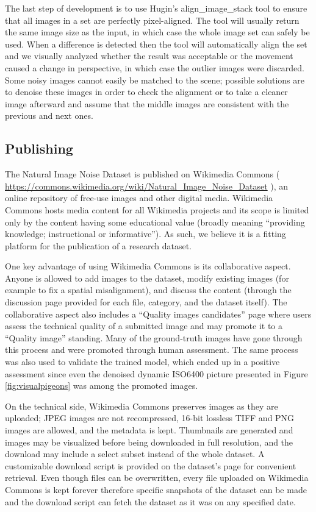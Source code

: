 The last step of development is to use Hugin's align\_image\_stack tool \cite{hugin} to ensure that all images in a set are perfectly pixel-aligned. The tool will usually return the same image size as the input, in which case the whole image set can safely be used. When a difference is detected then the tool will automatically align the set and we visually analyzed whether the result was acceptable or the movement caused a change in perspective, in which case the outlier images were discarded. Some noisy images cannot easily be matched to the scene; possible solutions are to denoise these images in order to check the alignment or to take a cleaner image afterward and assume that the middle images are consistent with the previous and next ones.
\subsection{Publishing}
The Natural Image Noise Dataset is published on Wikimedia Commons ( \url{https://commons.wikimedia.org/wiki/Natural_Image_Noise_Dataset} ), an online repository of free-use images and other digital media. Wikimedia Commons hosts media content for all Wikimedia projects and its scope is limited only by the content having some educational value (broadly meaning ``providing knowledge; instructional or informative''). As such, we believe it is a fitting platform for the publication of a research dataset.

One key advantage of using Wikimedia Commons is its collaborative aspect. Anyone is allowed to add images to the dataset, modify existing images (for example to fix a spatial misalignment), and discuss the content (through the discussion page provided for each file, category, and the dataset itself). The collaborative aspect also includes a ``Quality images candidates'' page \cite{qic} where users assess the technical quality of a submitted image and may promote it to a ``Quality image'' standing. Many of the ground-truth images have gone through this process and were promoted through human assessment. The same process was also used to validate the trained model, which ended up in a positive assessment since even the denoised dynamic ISO6400 picture presented in Figure \ref{fig:visualpigeons} was among the promoted images.

On the technical side, Wikimedia Commons preserves images as they are uploaded; JPEG images are not recompressed, 16-bit lossless TIFF and PNG images are allowed, and the metadata is kept. Thumbnails are generated and images may be visualized before being downloaded in full resolution, and the download may include a select subset instead of the whole dataset. A customizable download script is provided on the dataset's page for convenient retrieval. Even though files can be overwritten, every file uploaded on Wikimedia Commons is kept forever therefore specific snapshots of the dataset can be made and the download script can fetch the dataset as it was on any specified date.


